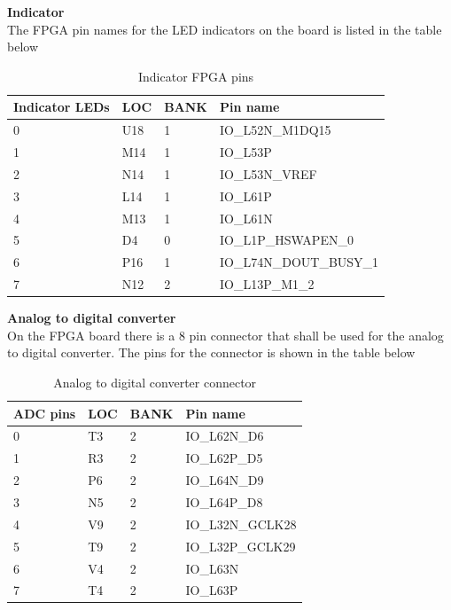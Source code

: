 \textbf{Indicator}\\
The FPGA pin names for the LED indicators on the board is listed in the table below
\begin{table}[H]
    \begin{tabular}{|p{3cm}|p{3cm}|p{3cm}|p{5cm}|}
        \hline
        \textbf{Indicator LEDs} & \textbf{LOC} & \textbf{BANK} & \textbf{Pin name}   \\ \hline
        0                       & U18          & 1             & IO\_L52N\_M1DQ15      \\ \hline
        1                       & M14          & 1             & IO\_L53P             \\ \hline
        2                       & N14          & 1             & IO\_L53N\_VREF        \\ \hline
        3                       & L14          & 1             & IO\_L61P             \\ \hline
        4                       & M13          & 1             & IO\_L61N             \\ \hline
        5                       & D4           & 0             & IO\_L1P\_HSWAPEN\_0    \\ \hline
        6                       & P16          & 1             & IO\_L74N\_DOUT\_BUSY\_1 \\ \hline
        7                       & N12          & 2             & IO\_L13P\_M1\_2        \\
        \hline
    \end{tabular}
    \caption{Indicator FPGA pins}
\end{table}

\textbf{Analog to digital converter}\\
On the FPGA board there is a 8 pin connector that shall be used for the analog to digital converter. The pins for the connector is shown in the table below
\begin{table}[H]
    \begin{tabular}{|p{3cm}|p{3cm}|p{3cm}|p{5cm}|}
        \hline
        \textbf{ADC pins} & \textbf{LOC} & \textbf{BANK} & \textbf{Pin name}   \\ \hline
        0 & T3 & 2 & IO\_L62N\_D6     \\ \hline
        1 & R3 & 2 & IO\_L62P\_D5     \\ \hline
        2 & P6 & 2 & IO\_L64N\_D9     \\ \hline
        3 & N5 & 2 & IO\_L64P\_D8     \\ \hline
        4 & V9 & 2 & IO\_L32N\_GCLK28 \\ \hline
        5 & T9 & 2 & IO\_L32P\_GCLK29 \\ \hline
        6 & V4 & 2 & IO\_L63N        \\ \hline
        7 & T4 & 2 & IO\_L63P        \\
        \hline
    \end{tabular}
    \caption{Analog to digital converter connector}
\end{table}

